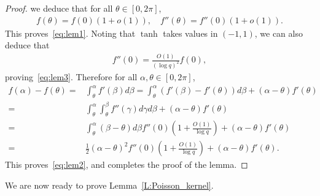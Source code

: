 \documentclass[11pt]{article}
\theoremstyle{remark}
\numberwithin{equation}{section}
\begin{document}
\begin{proof}
we deduce that for all $\theta\in [0,2\pi]$,
\begin{align*}
f(\theta) = f( 0)  \left(1+  o(1)\right), \quad f'' (\theta) = f'' ( 0)  \left(1+  o(1)\right).
\end{align*}
This proves~\eqref{eq:lem1}.
Noting that $\tanh$ takes values in $(-1,1)$, we can also deduce that
\begin{align*}
 f''(0) =\frac{O(1)}{(\log q)^2} f(0),
\end{align*}
proving~\eqref{eq:lem3}.
Therefore for all $\alpha, \theta\in [0, 2\pi]$,
\begin{align*}
f(\alpha) -f(\theta)=&\int_\theta^\alpha f'(\beta) d\beta= \int_\theta^\alpha (f'(\beta) - f'(\theta)) d\beta + (\alpha-\theta) f'(\theta)\\
=& \int_\theta^\alpha \int_\theta^\beta f''(\gamma) d\gamma d\beta + (\alpha-\theta) f'(\theta)\\
=& \int_\theta^\alpha (\beta -\theta) d\beta  f'' ( 0)  \left(1+  \frac{O(1)}{\log q}\right) + (\alpha-\theta) f'(\theta)\\
=&\frac12(\alpha-\theta)^2 f''(0)  \left(1+  \frac{O(1)}{\log q}\right) + (\alpha-\theta) f'(\theta).
\end{align*}
This proves~\eqref{eq:lem2}, and completes the proof of the lemma.
\end{proof}



We are now ready to prove Lemma~\ref{L:Poisson_kernel}.
\end{document}
